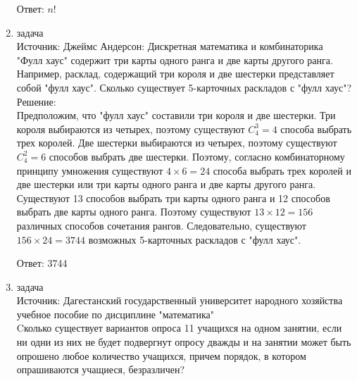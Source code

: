\documentclass[a4paper,14pt]{extreport} %
\begin{document}
\begin{center}
\begin{enumerate}
						Ответ: $n!$
						
						
%						
%							 
					\item {\large задача  }\\
					Источник: Джеймс Андерсон: Дискретная математика и комбинаторика\\
					\vspace{15pt}
					"Фулл хаус" содержит три карты одного ранга и две карты другого
					ранга. Например, расклад, содержащий три короля и две шестерки представляет
					собой "фулл хаус". Сколько существует 5-карточных раскладов с "фулл хаус"? \\
					\vspace{15pt}
					Решение:\\
					Предположим, что "фулл хаус" составили три короля и две шестерки. Три короля
					выбираются из четырех, поэтому существуют $C_4^3 = 4$  способа выбрать трех
					королей. Две шестерки выбираются из четырех, поэтому существуют $C_4^2 = 6$
					способов выбрать две шестерки. Поэтому, согласно комбинаторному принципу
					умножения существуют $4 \times 6 = 24$ способа выбрать трех королей и две шестерки
					или три карты одного ранга и две карты другого ранга. Существуют 13 способов
					выбрать три карты одного ранга и 12 способов выбрать две карты одного ранга.
					Поэтому существуют $13 \times 12 = 156$ различных способов сочетания рангов. Следовательно, существуют $156 \times 24 = 3744$ возможных 5-карточных раскладов с "фулл хаус".
					
					Ответ: 3744
					
					
						 \item {\large задача }\\
						Источник: Дагестанский государственный университет народного хозяйства учебное пособие по дисциплине "математика"  \\
						\vspace{15pt}
						Cколько существует вариантов опроса 11 учащихся на
						одном занятии, если ни одни из них не будет подвергнут опросу
						дважды и на занятии может быть опрошено любое количество
						учащихся, причем порядок, в котором опрашиваются учащиеся,
						безразличен?\\
						\vspace{15pt}
						

\end{enumerate}
\end{center}
\end{document}
